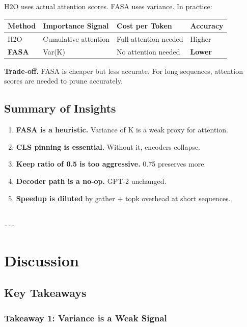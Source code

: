 H2O uses actual attention scores. FASA uses variance. In practice:

\begin{table}[H]
\centering
\small
\begin{tabular}{llll}
\toprule
\textbf{Method} & \textbf{Importance Signal} & \textbf{Cost per Token} & \textbf{Accuracy} \\
\midrule
H2O & Cumulative attention & Full attention needed & Higher \\
\textbf{FASA} & Var(K) & No attention needed & \textbf{Lower} \\
\bottomrule
\end{tabular}
\end{table}

\textbf{Trade-off.} FASA is cheaper but less accurate. For long sequences, 
attention scores are needed to prune accurately.

\subsection{Summary of Insights}

\begin{enumerate}
\item \textbf{FASA is a heuristic.} Variance of K is a weak proxy for attention.
\item \textbf{CLS pinning is essential.} Without it, encoders collapse.
\item \textbf{Keep ratio of 0.5 is too aggressive.} 0.75 preserves more.
\item \textbf{Decoder path is a no-op.} GPT-2 unchanged.
\item \textbf{Speedup is diluted} by gather + topk overhead at short sequences.
\end{enumerate}
\begin{lstlisting}

---
\end{lstlisting}


\section{Discussion}

\subsection{Key Takeaways}

\subsubsection{Takeaway 1: Variance is a Weak Signal}

